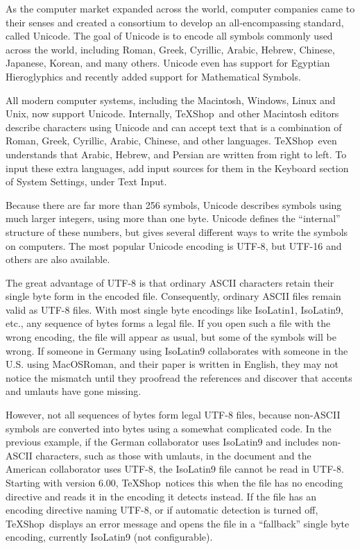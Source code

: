 \documentclass[letterpaper,11pt]{article}
\newcommand{\TS}{\textsf{\TeX Shop}}
\newcommand{\acr}[1]{\textsf{#1}}
\newcommand{\cmd}[1]{\textsf{#1}}
\begin{document}
As the computer market expanded across the world, computer companies came to their senses and created a consortium to develop an all-encompassing standard, called \acr{Unicode}. The goal of \acr{Unicode} is to encode all symbols commonly used across the world, including Roman, Greek, Cyrillic, Arabic, Hebrew, Chinese, Japanese, Korean, and many others. Unicode even has support for Egyptian Hieroglyphics and recently added support for Mathematical Symbols.

All modern computer systems, including the Macintosh, Windows, Linux and Unix, now support \acr{Unicode}. Internally, \TS\ and other Macintosh editors describe characters using \acr{Unicode} and can accept text that is a combination of Roman, Greek, Cyrillic, Arabic, Chinese, and other languages. \TS\ even understands that Arabic, Hebrew, and Persian are written from right to left. To input these extra languages, add input sources for them in the \cmd{Keyboard} section of \cmd{System Settings}, under \cmd{Text Input}.

Because there are far more than 256 symbols, Unicode describes symbols using much larger integers, using more than one byte. Unicode defines the ``internal'' structure of these numbers, but gives several different ways to write the symbols on computers. The most popular Unicode encoding is \acr{UTF-8}, but \acr{UTF-16} and others are also available.

The great advantage of \acr{UTF-8} is that ordinary \acr{ASCII} characters retain their single byte form in the encoded file. Consequently, ordinary \acr{ASCII} files remain valid as \acr{UTF-8} files. With most single byte encodings like \acr{IsoLatin1}, \acr{IsoLatin9}, etc., any sequence of bytes forms a legal file. If you open such a file with the wrong encoding, the file will appear as usual, but some of the symbols will be wrong. If someone in Germany using \acr{IsoLatin9} collaborates with someone in the U.S. using \acr{MacOSRoman}, and their paper is written in English, they may not notice the mismatch until they proofread the references and discover that accents and umlauts have gone missing.

However, not all sequences of bytes form legal \acr{UTF-8} files, because non-\acr{ASCII} symbols are converted into bytes using a somewhat complicated code. In the previous example, if the German collaborator uses \acr{IsoLatin9} and includes non-\acr{ASCII} characters, such as those with umlauts, in the document and the American collaborator uses \acr{UTF-8}, the \acr{IsoLatin9} file cannot be read in \acr{UTF-8}. Starting with version 6.00, \TS\ notices this when the file has no encoding directive and reads it in the encoding it detects instead. If the file has an encoding directive naming \acr{UTF-8}, or if automatic detection is turned off, \TS\ displays an error message and opens the file in a ``fallback'' single byte encoding, currently \acr{IsoLatin9} (not configurable).
\end{document}
